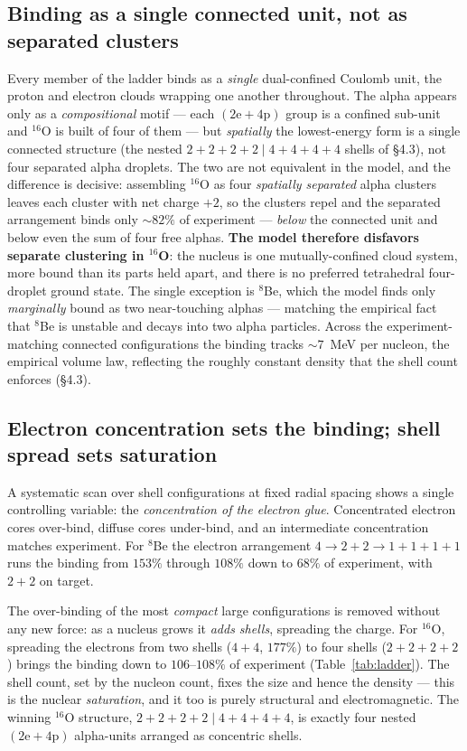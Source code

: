 \documentclass[11pt]{article}
\begin{document}
\subsection{Binding as a single connected unit, not as separated clusters}

Every member of the ladder binds as a \emph{single} dual-confined Coulomb unit, the proton and
electron clouds wrapping one another throughout. The alpha appears only as a \emph{compositional}
motif --- each $(\mathrm{2e}+\mathrm{4p})$ group is a confined sub-unit and $^{16}$O is built of
four of them --- but \emph{spatially} the lowest-energy form is a single connected structure
(the nested $2{+}2{+}2{+}2\mid 4{+}4{+}4{+}4$ shells of \S4.3), not four separated alpha
droplets. The two are not equivalent in the model, and the difference is decisive: assembling
$^{16}$O as four \emph{spatially separated} alpha clusters leaves each cluster with net charge
$+2$, so the clusters repel and the separated arrangement binds only ${\sim}82\%$ of experiment
--- \emph{below} the connected unit and below even the sum of four free alphas. \textbf{The model
therefore disfavors separate clustering in $^{16}$O}: the nucleus is one mutually-confined cloud
system, more bound than its parts held apart, and there is no preferred tetrahedral four-droplet
ground state. The single exception is $^8$Be, which the model finds only \emph{marginally} bound
as two near-touching alphas --- matching the empirical fact that $^8$Be is unstable and decays
into two alpha particles. Across the experiment-matching connected configurations the binding
tracks ${\sim}7$~MeV per nucleon, the empirical volume law, reflecting the roughly constant
density that the shell count enforces (\S4.3).

\subsection{Electron concentration sets the binding; shell spread sets saturation}

A systematic scan over shell configurations at fixed radial spacing shows a single controlling
variable: the \emph{concentration of the electron glue}. Concentrated electron cores over-bind,
diffuse cores under-bind, and an intermediate concentration matches experiment. For $^8$Be the
electron arrangement $4\to 2{+}2\to 1{+}1{+}1{+}1$ runs the binding from $153\%$ through $108\%$
down to $68\%$ of experiment, with $2{+}2$ on target.

The over-binding of the most \emph{compact} large configurations is removed without any new
force: as a nucleus grows it \emph{adds shells}, spreading the charge. For $^{16}$O, spreading
the electrons from two shells ($4{+}4$, $177\%$) to four shells ($2{+}2{+}2{+}2$) brings the
binding down to $106$--$108\%$ of experiment (Table~\ref{tab:ladder}). The shell count, set by
the nucleon count, fixes the size and hence the density --- this is the nuclear
\emph{saturation}, and it too is purely structural and electromagnetic. The winning
$^{16}$O structure, $2{+}2{+}2{+}2\mid 4{+}4{+}4{+}4$, is exactly four nested
$(\mathrm{2e}+\mathrm{4p})$ alpha-units arranged as concentric shells.
\end{document}

